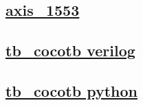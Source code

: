 \documentclass{article}
\begin{document}
  


  \subsection{\href{../files/axis_1553-v.html}{axis\_1553}}

  \subsection{\href{../files2/tb_cocotb-v.html}{tb\_cocotb verilog}}

  \subsection{\href{../files2/tb_cocotb-py.html}{tb\_cocotb python}}
\end{document}
